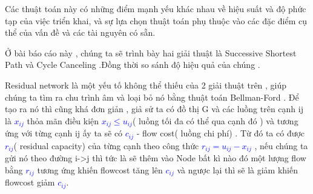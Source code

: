 \documentclass[a4paper]{article}
\begin{document}
Các thuật toán này có những điểm mạnh yếu khác nhau về hiệu suất và độ phức tạp của việc triển khai, và sự lựa chọn thuật toán phụ thuộc vào các đặc điểm cụ thể của vấn đề và các tài nguyên có sẵn. 

Ở bài báo cáo này , chúng ta sẽ trình bày hai giải thuật là Successive Shortest Path và Cycle Canceling .Đồng thời so sánh độ hiệu quả của chúng .

Residual network là một yếu tố không thể thiếu của 2 giải thuật trên , giúp chúng ta tìm ra chu trình âm và loại bỏ nó bằng thuật toán Bellman-Ford . Để tạo ra nó thì cũng khá đơn giản , giả sử ta có đồ thị G và các luồng trên cạnh ij là \textcolor{blue}{$x_{i j}$} thỏa mãn điều kiện \textcolor{blue}{$x_{i j} \leqslant  u_{i j}$}( luồng tối đa có thể qua cạnh đó ) và tương ứng với từng cạnh ij ấy ta sẽ có \textcolor{blue}{$c_{i j}$} - flow cost( luồng chi phí) . Từ đó ta có được \textcolor{blue}{$r_{ij}$}( residual capacity) của từng cạnh theo công thức \textcolor{blue}{$r_{i j} = u_{i j} - x_{i j}$} , nếu chúng ta gửi nó theo đường i->j thì tức là sẽ thêm vào Node bất kì nào đó một lượng flow bằng \textcolor{blue}{$r_{i j}$} tương ứng khiến flowcost tăng lên \textcolor{blue}{$c_{i j}$} và ngược lại thì sẽ là giảm khiến flowcost giảm \textcolor{blue}{$c_{i j}$}.
   
\end{document}
